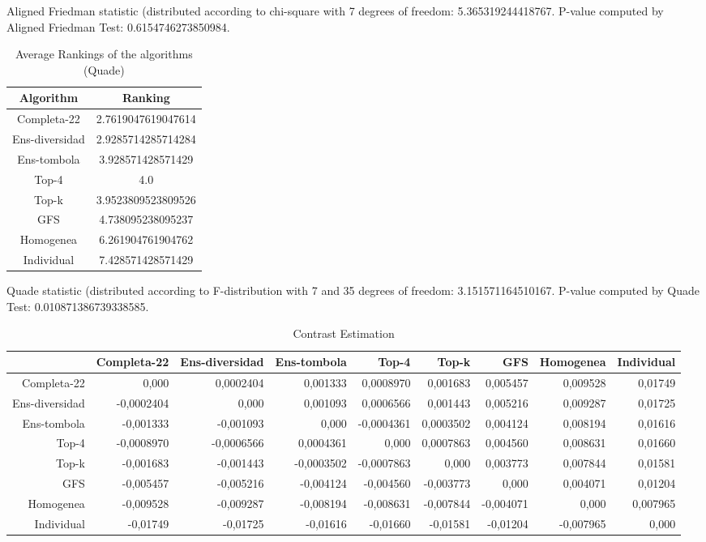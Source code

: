 \documentclass[a4paper,10pt]{article}
\begin{document}
\begin{landscape}
Aligned Friedman statistic (distributed according to chi-square with 7 degrees of freedom: 5.365319244418767. 
P-value computed by Aligned Friedman Test: 0.6154746273850984.\newline


\newpage

\begin{table}[!htp]
\centering
\caption{Average Rankings of the algorithms (Quade)
}\begin{tabular}{c|c}
Algorithm&Ranking\\
\hline
Completa-22&2.7619047619047614\\
Ens-diversidad&2.9285714285714284\\
Ens-tombola&3.928571428571429\\
Top-4&4.0\\
Top-k&3.9523809523809526\\
GFS&4.738095238095237\\
Homogenea&6.261904761904762\\
Individual&7.428571428571429\\
\end{tabular}
\end{table}
Quade statistic (distributed according to F-distribution with 7 and 35 degrees of freedom: 3.151571164510167. 
P-value computed by Quade Test: 0.010871386739338585.\newline


\newpage

\begin{table}[!htp]
\centering\tiny
\caption{Contrast Estimation}
\begin{tabular}{
|r|r|r|r|r|r|r|r|r|}
\hline
 &Completa-22&Ens-diversidad&Ens-tombola&Top-4&Top-k&GFS&Homogenea&Individual\\
\hline
Completa-22&0,000&0,0002404&0,001333&0,0008970&0,001683&0,005457&0,009528&0,01749\\
\hline
Ens-diversidad&-0,0002404&0,000&0,001093&0,0006566&0,001443&0,005216&0,009287&0,01725\\
\hline
Ens-tombola&-0,001333&-0,001093&0,000&-0,0004361&0,0003502&0,004124&0,008194&0,01616\\
\hline
Top-4&-0,0008970&-0,0006566&0,0004361&0,000&0,0007863&0,004560&0,008631&0,01660\\
\hline
Top-k&-0,001683&-0,001443&-0,0003502&-0,0007863&0,000&0,003773&0,007844&0,01581\\
\hline
GFS&-0,005457&-0,005216&-0,004124&-0,004560&-0,003773&0,000&0,004071&0,01204\\
\hline
Homogenea&-0,009528&-0,009287&-0,008194&-0,008631&-0,007844&-0,004071&0,000&0,007965\\
\hline
Individual&-0,01749&-0,01725&-0,01616&-0,01660&-0,01581&-0,01204&-0,007965&0,000\\
\hline


\end{tabular}
\end{table}
\end{landscape}
\end{document}

